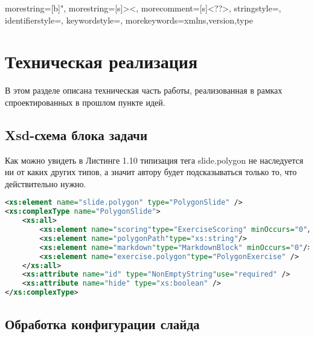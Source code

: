 


{
  morestring=[b]",
  morestring=[s]{>}{<},
  morecomment=[s]{<?}{?>},
  stringstyle=\color{black},
  identifierstyle=\color{darkblue},
  keywordstyle=\color{cyan},
  morekeywords={xmlns,version,type}%
}


\section{Техническая реализация}
\label{cha:impl}

В этом разделе описана техническая часть работы, реализованная в рамках спроектированных в прошлом пункте идей.


\subsection{Xsd-схема блока задачи}

Как можно увидеть в Листинге 1.10 типизация тега slide.polygon не наследуется ни от каких других типов, а значит автору будет подсказываться только то, что действительно нужно.

\begin{lstlisting}[caption={Реализация xsd-схемы тега slide.polygon}, language={XML}]
<xs:element name="slide.polygon" type="PolygonSlide" />
<xs:complexType name="PolygonSlide">
	<xs:all>
		<xs:element name="scoring"type="ExerciseScoring" minOccurs="0"/>
		<xs:element name="polygonPath"type="xs:string"/>
		<xs:element name="markdown"type="MarkdownBlock" minOccurs="0"/>
		<xs:element name="exercise.polygon"type="PolygonExercise" />
	</xs:all>
	<xs:attribute name="id" type="NonEmptyString"use="required" />
	<xs:attribute name="hide" type="xs:boolean" />
</xs:complexType>
\end{lstlisting}

\subsection{Обработка конфигурации слайда}

